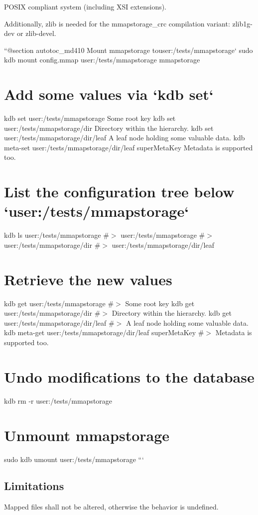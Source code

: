 P\+O\+S\+IX compliant system (including X\+SI extensions).

Additionally, zlib is needed for the {\ttfamily mmapstorage\+\_\+crc} compilation variant\+: {\ttfamily zlib1g-\/dev} or {\ttfamily zlib-\/devel}.

``{\ttfamily  @section autotoc\+\_\+md410 Mount mmapstorage to}user\+:/tests/mmapstorage` sudo kdb mount config.\+mmap user\+:/tests/mmapstorage mmapstorage\hypertarget{autotoc_md404_autotoc_md411}{}\section{Add some values via `kdb set`}\label{autotoc_md404_autotoc_md411}
kdb set user\+:/tests/mmapstorage \textquotesingle{}Some root key\textquotesingle{} kdb set user\+:/tests/mmapstorage/dir \textquotesingle{}Directory within the hierarchy.\textquotesingle{} kdb set user\+:/tests/mmapstorage/dir/leaf \textquotesingle{}A leaf node holding some valuable data.\textquotesingle{} kdb meta-\/set user\+:/tests/mmapstorage/dir/leaf super\+Meta\+Key \textquotesingle{}Metadata is supported too.\textquotesingle{}\hypertarget{autotoc_md404_autotoc_md412}{}\section{List the configuration tree below `user\+:/tests/mmapstorage`}\label{autotoc_md404_autotoc_md412}
kdb ls user\+:/tests/mmapstorage \#$>$ user\+:/tests/mmapstorage \#$>$ user\+:/tests/mmapstorage/dir \#$>$ user\+:/tests/mmapstorage/dir/leaf\hypertarget{autotoc_md404_autotoc_md413}{}\section{Retrieve the new values}\label{autotoc_md404_autotoc_md413}
kdb get user\+:/tests/mmapstorage \#$>$ Some root key kdb get user\+:/tests/mmapstorage/dir \#$>$ Directory within the hierarchy. kdb get user\+:/tests/mmapstorage/dir/leaf \#$>$ A leaf node holding some valuable data. kdb meta-\/get user\+:/tests/mmapstorage/dir/leaf super\+Meta\+Key \#$>$ Metadata is supported too.\hypertarget{autotoc_md404_autotoc_md414}{}\section{Undo modifications to the database}\label{autotoc_md404_autotoc_md414}
kdb rm -\/r user\+:/tests/mmapstorage\hypertarget{autotoc_md404_autotoc_md415}{}\section{Unmount mmapstorage}\label{autotoc_md404_autotoc_md415}
sudo kdb umount user\+:/tests/mmapstorage ```\hypertarget{autotoc_md404_autotoc_md416}{}\subsection{Limitations}\label{autotoc_md404_autotoc_md416}
Mapped files shall not be altered, otherwise the behavior is undefined.

